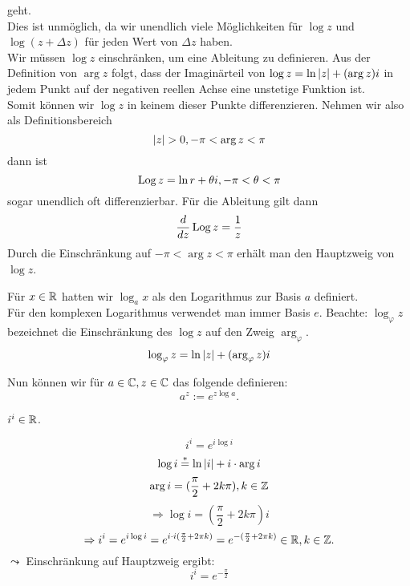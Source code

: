 \documentclass[../ana2u.tex]{subfiles}
\begin{document}
geht.\\
Dies ist unmöglich, da wir unendlich viele Möglichkeiten
für \( \log z \) und \( \log (z + \Delta z) \) für 
jeden Wert von \( \Delta z \) haben. \\
Wir müssen \( \log z \) einschränken, um eine Ableitung 
zu definieren. Aus der Definition von \( \arg z \) folgt,
dass der Imaginärteil von \( \log z = \ln \left|z\right| + (\arg z)i \)
in jedem Punkt auf der negativen reellen Achse eine
unstetige Funktion ist.\\
Somit können wir \( \log z \) in keinem dieser Punkte 
differenzieren. Nehmen wir also als Definitionsbereich
\[ \left|z\right| > 0, -\pi < \arg z < \pi \]
dann ist 
\[ \operatorname{Log} z = \ln r + \theta i, -\pi < \theta < \pi \]
sogar unendlich oft differenzierbar.
Für die Ableitung gilt dann
\[ \frac{d}{dz} \operatorname{Log} z = \frac{1}{z} \]
Durch die Einschränkung auf \( -\pi < \arg z < \pi \)
erhält man den Hauptzweig von \( \log z \).
\begin{bem}
    Für \( x \in \mathbb{R} \) hatten wir \(\log_a x \) als den Logarithmus
    zur Basis \(a \) definiert. \\
    Für den komplexen Logarithmus verwendet man immer Basis \(e\).
    Beachte: \( \log_\varphi z \) bezeichnet die Einschränkung
    des \(\log z \) auf den Zweig \( \arg_\varphi \). 
    \[ \log_\varphi z = \ln \left|z\right| + (\arg_\varphi z)i \]
\end{bem}
Nun können wir für \( a \in \mathbb{C}, z \in \mathbb{C} \) das 
folgende definieren:
\[ a^z := e^{z \log a}. \]
\begin{beh}
    \( i^i \in\mathbb{R} \).
\end{beh}
\begin{bew}
    \[ i^i = e^{i \log i} \]
    \[ \log i \overset{*}{=} \ln \left|i\right| + i \cdot \arg i \]
    \[ \arg i = (\frac{\pi}{2} + 2k\pi), k \in \mathbb{Z} \]
    \[ \Rightarrow \log i = (\frac{\pi}{2} + 2k\pi)i \]
    \[ \Rightarrow i^i = e^{i \log i} 
    = e^{i \cdot i(\frac{\pi}{2} + 2 \pi k)} 
    = e^{-(\frac{\pi}{2} + 2\pi k)} \in\mathbb{R}, k\in\mathbb{Z}. \]
    \( \leadsto \) Einschränkung auf Hauptzweig ergibt: 
    \[ i^i = e^{-\frac{\pi}{2}} \]
\end{bew}
\end{document}
